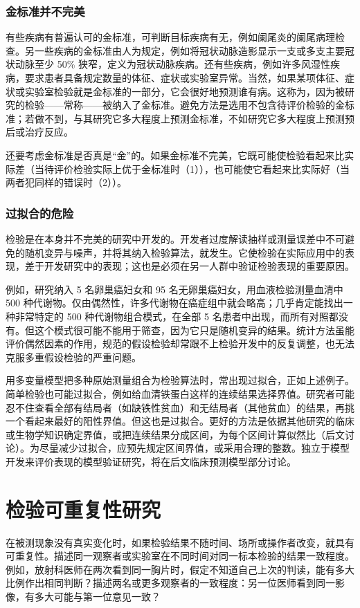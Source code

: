 \subsubsection{金标准并不完美}
有些疾病有普遍认可的金标准，可判断目标疾病有无，例如阑尾炎的阑尾病理检查。另一些疾病的金标准由人为规定，例如将冠状动脉造影显示一支或多支主要冠状动脉至少 50\% 狭窄，定义为冠状动脉疾病。还有些疾病，例如许多风湿性疾病，要求患者具备规定数量的体征、症状或实验室异常。当然，如果某项体征、症状或实验室检验就是金标准的一部分，它会很好地预测谁有病。这称为，因为被研究的检验——常称——被纳入了金标准。避免方法是选用不包含待评价检验的金标准；若做不到，与其研究它多大程度上预测金标准，不如研究它多大程度上预测预后或治疗反应。

还要考虑金标准是否真是“金”的。如果金标准不完美，它既可能使检验看起来比实际差（当待评价检验实际上优于金标准时（1）），也可能使它看起来比实际好（当两者犯同样的错误时（2））。

\subsubsection{过拟合的危险}
检验是在本身并不完美的研究中开发的。开发者过度解读抽样或测量误差中不可避免的随机变异与噪声，并将其纳入检验算法，就发生。它使检验在实际应用中的表现，差于开发研究中的表现；这也是必须在另一人群中验证检验表现的重要原因。

例如，研究纳入 5 名卵巢癌妇女和 95 名无卵巢癌妇女，用血液检验测量血清中 500 种代谢物。仅由偶然性，许多代谢物在癌症组中就会略高；几乎肯定能找出一种非常特定的 500 种代谢物组合模式，在全部 5 名患者中出现，而所有对照都没有。但这个模式很可能不能用于筛查，因为它只是随机变异的结果。统计方法虽能评价偶然因素的作用，规范的假设检验却常跟不上检验开发中的反复调整，也无法克服多重假设检验的严重问题。

用多变量模型把多种原始测量组合为检验算法时，常出现过拟合，正如上述例子。简单检验也可能过拟合，例如给血清铁蛋白这样的连续结果选择界值。研究者可能忍不住查看全部有结局者（如缺铁性贫血）和无结局者（其他贫血）的结果，再挑一个看起来最好的阳性界值。但这也是过拟合。更好的方法是依据其他研究的临床或生物学知识确定界值，或把连续结果分成区间，为每个区间计算似然比（后文讨论）。为尽量减少过拟合，应预先规定区间界值，或采用合理的整数。独立于模型开发来评价表现的模型验证研究，将在后文临床预测模型部分讨论。

\section{检验可重复性研究}
在被测现象没有真实变化时，如果检验结果不随时间、场所或操作者改变，就具有可重复性。描述同一观察者或实验室在不同时间对同一标本检验的结果一致程度。例如，放射科医师在两次看到同一胸片时，假定不知道自己上次的判读，能有多大比例作出相同判断？描述两名或更多观察者的一致程度：另一位医师看到同一影像，有多大可能与第一位意见一致？

